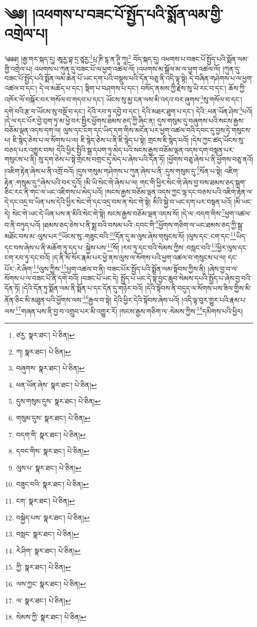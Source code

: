\setcounter{footnote}{0} 
\chapter{༄༅། །འཕགས་པ་བཟང་པོ་སྤྱོད་པའི་སྨོན་ལམ་གྱི་འགྲེལ་པ།}༄༅༅། །རྒྱ་གར་སྐད་དུ། ཨཱརྱ་བྷ་དྲ་ཙཱརྱ་\footnote{ཙརྱ་  སྣར་ཐང་།  པེ་ཅིན། }པྲ་ཎི་དྷ་ན་ཊཱི་ཀཱ།\footnote{ཀ།  སྣར་ཐང་།  པེ་ཅིན། } བོད་སྐད་དུ། འཕགས་པ་བཟང་པོ་སྤྱོད་པའི་སྨོན་ལམ་གྱི་འགྲེལ་པ། འཕགས་པ་ཀུན་དུ་བཟང་པོ་ལ་ཕྱག་འཚལ་ལོ། །འཕགས་མ་སྒྲོལ་མ་ལ་ཕྱག་འཚལ་ལོ། །ཀུན་དུ་བཟང་པོ་སྤྱོད་པའི་སྨོན་ལམ་ཆེན་པོ་ཡང་དག་པའི་བསྡུས་པའི་དོན་བཅུ་ནི་འདི་ལྟ་སྟེ། དེ་བཞིན་གཤེགས་པ་ལ་ཕྱག་འཚལ་བ་དང་། དེ་ལ་མཆོད་པ་དང་། སྡིག་པ་བཤགས་པ་དང་། བསོད་ནམས་ཀྱི་རྗེས་སུ་ཡི་རང་བ་དང་། ཆོས་ཀྱི་འཁོར་ལོ་བསྐོར་བར་གསོལ་བ་གདབ་པ་དང་། ཡོངས་སུ་མྱ་ངན་ལས་མི་འདའ་བར་ཞུགས་\footnote{བཞུགས་  སྣར་ཐང་།  པེ་ཅིན། }སུ་གསོལ་བ་དང་། དགེ་བའི་རྩ་བ་ཡོངས་སུ་བསྔོ་བ་དང་། དེའི་རབ་ཏུ་དབྱེ་བ་དང་། དེའི་མཐར་ཐུག་པ་དང་། དེའི་:ཕན་ཡོན་ཤེས་\footnote{ཕན་ཡོན་ཞེས་  སྣར་ཐང་།  པེ་ཅིན། }པའོ། །དེ་ལ་དང་པོར་བྱེ་བྲག་ཏུ་མ་ཕྱེ་བར་སྤྱིར་ཕྱོགས་ཐམས་ཅད་ཀྱི་ཞིང་ན། དུས་གསུམ་དུ་བཞུགས་པའི་སངས་རྒྱས་བཅོམ་ལྡན་འདས་དག་ལ། ལུས་དང་ངག་དང་ཡིད་དག་གིས་མངོན་པར་ཕྱག་འཚལ་བའི་དབང་དུ་བྱས་ཏེ་གསུངས་པ། ཇི་སྙེད་ཅེས་པ་ལ་སོགས་པ་ལ། ཇི་སྙེད་ཅེས་པ་ནི་ཇི་སྙེད་པ་སྟེ། གྲངས་ཇི་སྙེད་པའོ། །དེས་ཀྱང་ཚད་ཡོངས་སུ་བཅད་པར་འགྱུར་བས། དེའི་ཕྱིར་སྤྱིའི་སྒྲ་དཔག་ཏུ་མེད་པའི་སངས་རྒྱས་བཅོམ་ལྡན་འདས་དག་བསྟན་པར་གསུངས་པ་ནི། སུ་དག་ཅེས་པ་སྟེ་གྲངས་བགྲང་དུ་མེད་པ་ཞེས་པའི་དོན་ཏོ། །ཕྱོགས་བཅུ་ཞེས་པ་ནི་ཕྱོགས་བཅུ་ནའོ། །འཇིག་རྟེན་ཞེས་པ་ནི་འགྲོ་བའོ། །དུས་གསུམ་གཤེགས་པ་ཀུན་ཞེས་པ་ནི་:དུས་གསུམ་དུ་\footnote{དུས་གསུམ་དུས་  སྣར་ཐང་།  པེ་ཅིན། }སོན་པ་སྟེ། འཇིག་རྟེན་:གསུམ་དུ་\footnote{གསུམ་དུས་  སྣར་ཐང་།  པེ་ཅིན། }ཞེས་པའི་བར་དུའོ། །མི་ཡི་སེང་གེ་ཞེས་པ་ལ། གང་གི་ཕྱིར་སེང་གེ་ཞེས་བྱ་བས་ཐམས་ཅད་སྐྲག་ཅིང་རང་ནི་གང་ལ་ཡང་འཇིགས་པ་མེད་པའོ། །སངས་རྒྱས་བཅོམ་ལྡན་འདས་ཀྱང་ལྷ་དང་བཅས་པའི་འཇིག་རྟེན་ལ་དེ་དང་འདྲ་བ་ཡིན་པས་དེའི་ཕྱིར་སེང་གེ་དང་འདྲ་བས་ན་སེང་གེ་སྟེ། མིའི་སྐྱེ་བ་ཡང་དག་པར་བསྟན་པའོ། །མི་ཡང་དེ། སེང་གེ་ཡང་དེ་ཡིན་པས་ན་མིའི་སེང་གེ་སྟེ། སངས་རྒྱས་བཅོམ་ལྡན་འདས་སོ། །དེ་ལ་:བདག་གིས་\footnote{བདག་གི་  སྣར་ཐང་།  པེ་ཅིན། }ཕྱག་འཚལ་བ་ནི་བཏུད་པའོ། །ཐམས་ཅད་ཅེས་པ་ནི་སྨྲ་བའི་བསམ་པའི་:དབང་གི་\footnote{དབང་གིས་  སྣར་ཐང་།  པེ་ཅིན། }ཕྱོགས་གཅིག་ལ་ཡང་ཐམས་ཅད་ཀྱི་སྒྲ་མཐོང་བས་མ་:ལུས་པར་\footnote{ལུས་པ་  སྣར་ཐང་།  པེ་ཅིན། }ཡོངས་སུ་:གཟུང་བའི་\footnote{བཟུང་བའི་  སྣར་ཐང་།  པེ་ཅིན། }དོན་དུ་མ་ལུས་ཞེས་གསུངས་སོ། །ལུས་དང་:ངག་དང་\footnote{ངག་  སྣར་ཐང་།  པེ་ཅིན། }ཡིད་དང་བས་ཞེས་པ་ནི་མཆོག་ཏུ་དད་པ་:སྐྱེས་པས་\footnote{བསྐྱེད་པས་  སྣར་ཐང་།  པེ་ཅིན། }སོ། །རབ་ཏུ་དང་བའི་སེམས་ཀྱིས་:བསླང་བའི་\footnote{བསླང་  སྣར་ཐང་།  པེ་ཅིན། }ཕྱིར་ལུས་དང་ངག་རབ་ཏུ་དང་བའོ། །ད་ནི་སོ་སོར་རྣམ་པར་ཕྱེ་ནས་ལུས་ལ་སོགས་པའི་ཕྱག་འཚལ་བ་གསུངས་པ་ལ། དང་པོར་:རེ་ཞིག་\footnote{རེ་ཤིག་  སྣར་ཐང་།  པེ་ཅིན། }ལུས་ཀྱིས་\footnote{ཀྱི་  སྣར་ཐང་།  པེ་ཅིན། }ཕྱག་འཚལ་བ་ནི། བཟང་པོར་སྤྱོད་པའི་སྨོན་ལམ་སྟོབས་ཀྱིས་ནི། །ཞེས་བྱ་བ་ལ་སོགས་པ་ལ་བཟང་པོ་ནི་དགེ་བའོ། །བཟང་པོ་ཡང་དེ། སྤྱོད་པ་ཡང་དེ་སྟེ་བྱང་ཆུབ་སེམས་དཔའི་སྤྱོད་པ་ཞེས་བྱ་བའི་དོན་ཏོ། །དེའི་དོན་ཏུ་སྨོན་ལམ་ནི་སྨོན་པ་དང་དོན་དུ་གཉེར་བའོ། །དེའི་སྟོབས་ནི་བདུད་ལ་སོགས་པས་ཟིལ་གྱིས་མི་ནོན་ཅིང་མི་མཐུན་པའི་ཕྱོགས་ལས་\footnote{ལས་ཀྱང་  སྣར་ཐང་།  པེ་ཅིན། }རྒྱལ་བ་སྟེ། དེའི་ཕྱིར་དེའི་སྟོབས་ཞེས་པའོ། །འདི་ལྟ་བུར་གྱུར་པའི་རྣམ་པ་ལས་\footnote{ལ་  སྣར་ཐང་།  པེ་ཅིན། }གཞན་པས་ནི་བྱ་བ་འགྲུབ་པར་མི་འགྱུར་རོ། །སངས་རྒྱས་གཅིག་ལ་:སེམས་ཀྱིས་\footnote{སེམས་ཀྱི་  སྣར་ཐང་།  པེ་ཅིན། }དམིགས་པའི་ཕྱིར། 